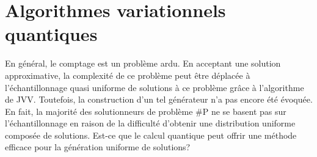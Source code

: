 \chapter{Algorithmes variationnels quantiques}
\label{cha:algorithmes-variationnels-quantiques}

En général, le comptage est un problème ardu. En acceptant une solution approximative, la complexité de ce problème peut être déplacée à l'échantillonnage quasi uniforme de solutions à ce problème grâce à l'algorithme de JVV. Toutefois, la construction d'un tel générateur n'a pas encore été évoquée. En fait, la majorité des solutionneurs de problème \textsf{\#P} ne se basent pas sur l'échantillonnage en raison de la difficulté d'obtenir une distribution uniforme composée de solutions. Est-ce que le calcul quantique peut offrir une méthode efficace pour la génération uniforme de solutions?

